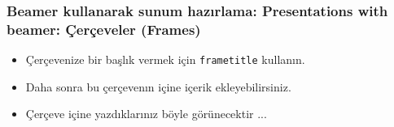 \begin{frame}
  \frametitle{Beamer kullanarak sunum hazırlama: Presentations with beamer: Çerçeveler (Frames)}
  \begin{itemize}
    \item Çerçevenize bir başlık vermek için \texttt{frametitle} kullanın.
    \item Daha sonra bu çerçevenın içine içerik ekleyebilirsiniz.
    \item Çerçeve içine yazdıklarınız böyle görünecektir ...
  \end{itemize}
\end{frame}

